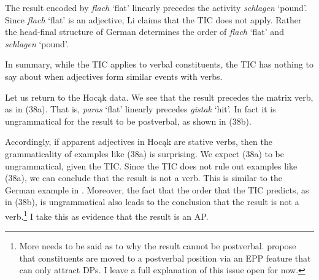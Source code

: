 \documentclass[output=paper]{LSP/langsci}
\begin{document}
The result encoded by \textit{flach} `flat' linearly precedes the activity \textit{schlagen} `pound'. Since \textit{flach} `flat' is an adjective, Li claims that the TIC does not apply. Rather the head-final structure of German determines the order of \textit{flach} `flat' and \textit{schlagen} `pound'. 

In summary, while the TIC applies to verbal constituents, the TIC has nothing to say about when adjectives form similar events with verbs.

Let us return to the Hocąk data. We see that the result precedes the matrix verb, as in (38a). That is, \textit{paras} `flat' linearly precedes \textit{gistak} `hit'. In fact it is ungrammatical for the result to be postverbal, as shown in (38b).

\begin{exe}
\ex\label{ex:rosen:38}
\begin{xlist}



\end{xlist}
\end{exe}

Accordingly, if apparent adjectives in Hocąk are stative verbs, then the grammaticality of examples like (38a) is surprising. We expect (38a) to be ungrammatical, given the TIC. Since the TIC does not rule out examples like (38a), we can conclude that the result is not a verb. This is similar to the German example in . Moreover, the fact that the order that the TIC predicts, as in (38b), is ungrammatical also leads to the conclusion that the result is not a verb.\footnote{More needs to be said as to why the result cannot be postverbal. \citet{JohnsonRosen2014} propose that constituents are moved to a postverbal position via an EPP feature that can only attract DPs. I leave a full explanation of this issue open for now.} I take this as evidence that the result is an AP.
\end{document}
